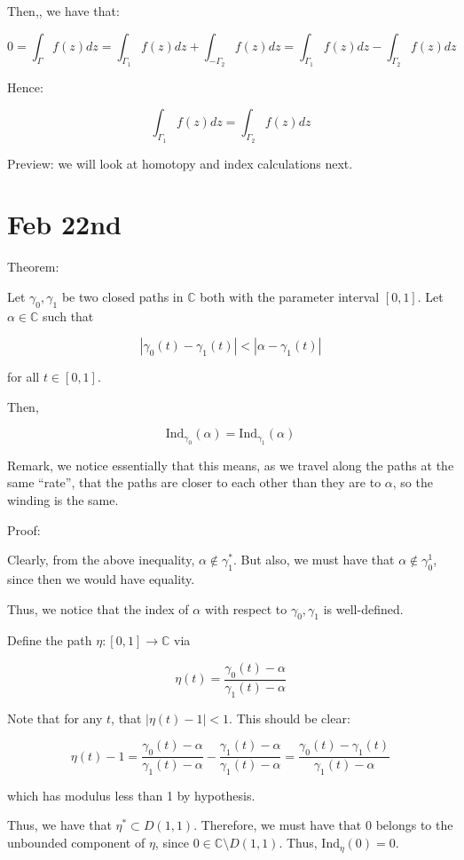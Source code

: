 \documentclass[10pt]{article}
\newcommand{\ind}{\text{Ind}}
\begin{document}
Then,, we have that:

$$ 0 = \int_\Gamma f(z) dz = \int_{\Gamma_1} f(z) dz + \int_{-\Gamma_2} f(z) dz =  \int_{\Gamma_1} f(z) dz - \int_{\Gamma_2} f(z) dz$$

Hence:

$$ \int_{\Gamma_1} f(z) dz  = \int_{\Gamma_2} f(z) dz$$

Preview: we will look at homotopy and index calculations next.

\section*{Feb 22nd}

Theorem:

Let $\gamma_0, \gamma_1$ be two closed paths in $\mathbb{C}$ both with the parameter interval $[0,1]$. Let $\alpha \in \mathbb{C}$ such that

$$| \gamma_0(t) - \gamma_1(t) | < | \alpha - \gamma_1(t) | $$

for all $t \in [0,1]$.

Then, 

$$ \ind_{\gamma_0}(\alpha) = \ind_{\gamma_1}(\alpha) $$

Remark, we notice essentially that this means, as we travel along the paths at the same “rate”, that the paths are closer to each other than they are to $\alpha$, so the winding is the same.

Proof:

Clearly, from the above inequality, $\alpha \not \in \gamma_1^*$. But also, we must have that $\alpha \not \in \gamma_0^1$, since then we would have equality.

Thus, we notice that the index of $\alpha$ with respect to $\gamma_0, \gamma_1$ is well-defined.

Define the path $\eta: [0,1] \to \mathbb{C}$ via

$$\eta(t) = \frac{\gamma_0(t) - \alpha}{\gamma_1(t) - \alpha} $$

Note that for any $t$, that $| \eta(t)  - 1 | < 1 $. This should be clear:

$$ \eta(t) - 1 = \frac{\gamma_0(t) - \alpha}{\gamma_1(t) - \alpha} - \frac{\gamma_1(t) - \alpha}{\gamma_1(t) - \alpha} = \frac{\gamma_0(t) - \gamma_1(t)}{\gamma_1(t) - \alpha} $$

which has modulus less than 1 by hypothesis.

Thus, we have that $\eta^* \subset D(1,1)$. Therefore, we must have that $0$ belongs to the unbounded component of $\eta$, since $0 \in \mathbb{C} \setminus D(1,1)$. Thus, $\ind_\eta(0) = 0$.
\end{document}
